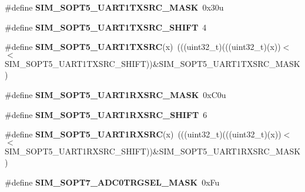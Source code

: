\begin{DoxyCompactItemize}
\item 
\#define {\bfseries S\+I\+M\+\_\+\+S\+O\+P\+T5\+\_\+\+U\+A\+R\+T1\+T\+X\+S\+R\+C\+\_\+\+M\+A\+SK}~0x30u\hypertarget{group__SIM__Register__Masks_gac473b632c382f785d524c177ff186e0d}{}\label{group__SIM__Register__Masks_gac473b632c382f785d524c177ff186e0d}

\item 
\#define {\bfseries S\+I\+M\+\_\+\+S\+O\+P\+T5\+\_\+\+U\+A\+R\+T1\+T\+X\+S\+R\+C\+\_\+\+S\+H\+I\+FT}~4\hypertarget{group__SIM__Register__Masks_ga7714c11e5536dacc90fbc2960e532e94}{}\label{group__SIM__Register__Masks_ga7714c11e5536dacc90fbc2960e532e94}

\item 
\#define {\bfseries S\+I\+M\+\_\+\+S\+O\+P\+T5\+\_\+\+U\+A\+R\+T1\+T\+X\+S\+RC}(x)~(((uint32\+\_\+t)(((uint32\+\_\+t)(x))$<$$<$S\+I\+M\+\_\+\+S\+O\+P\+T5\+\_\+\+U\+A\+R\+T1\+T\+X\+S\+R\+C\+\_\+\+S\+H\+I\+FT))\&S\+I\+M\+\_\+\+S\+O\+P\+T5\+\_\+\+U\+A\+R\+T1\+T\+X\+S\+R\+C\+\_\+\+M\+A\+SK)\hypertarget{group__SIM__Register__Masks_ga78611068b87a39563cd065ff840e3c68}{}\label{group__SIM__Register__Masks_ga78611068b87a39563cd065ff840e3c68}

\item 
\#define {\bfseries S\+I\+M\+\_\+\+S\+O\+P\+T5\+\_\+\+U\+A\+R\+T1\+R\+X\+S\+R\+C\+\_\+\+M\+A\+SK}~0x\+C0u\hypertarget{group__SIM__Register__Masks_gaf34eb14baf5894693130af7addd8aa6f}{}\label{group__SIM__Register__Masks_gaf34eb14baf5894693130af7addd8aa6f}

\item 
\#define {\bfseries S\+I\+M\+\_\+\+S\+O\+P\+T5\+\_\+\+U\+A\+R\+T1\+R\+X\+S\+R\+C\+\_\+\+S\+H\+I\+FT}~6\hypertarget{group__SIM__Register__Masks_ga098fcb3123342f9cd96869c69d2fb7a9}{}\label{group__SIM__Register__Masks_ga098fcb3123342f9cd96869c69d2fb7a9}

\item 
\#define {\bfseries S\+I\+M\+\_\+\+S\+O\+P\+T5\+\_\+\+U\+A\+R\+T1\+R\+X\+S\+RC}(x)~(((uint32\+\_\+t)(((uint32\+\_\+t)(x))$<$$<$S\+I\+M\+\_\+\+S\+O\+P\+T5\+\_\+\+U\+A\+R\+T1\+R\+X\+S\+R\+C\+\_\+\+S\+H\+I\+FT))\&S\+I\+M\+\_\+\+S\+O\+P\+T5\+\_\+\+U\+A\+R\+T1\+R\+X\+S\+R\+C\+\_\+\+M\+A\+SK)\hypertarget{group__SIM__Register__Masks_ga51d909264c2944ea7fb47356aa705536}{}\label{group__SIM__Register__Masks_ga51d909264c2944ea7fb47356aa705536}

\item 
\#define {\bfseries S\+I\+M\+\_\+\+S\+O\+P\+T7\+\_\+\+A\+D\+C0\+T\+R\+G\+S\+E\+L\+\_\+\+M\+A\+SK}~0x\+Fu\hypertarget{group__SIM__Register__Masks_gaeda70babef834cacace2c775d62bb4ae}{}\label{group__SIM__Register__Masks_gaeda70babef834cacace2c775d62bb4ae}


\end{DoxyCompactItemize}
